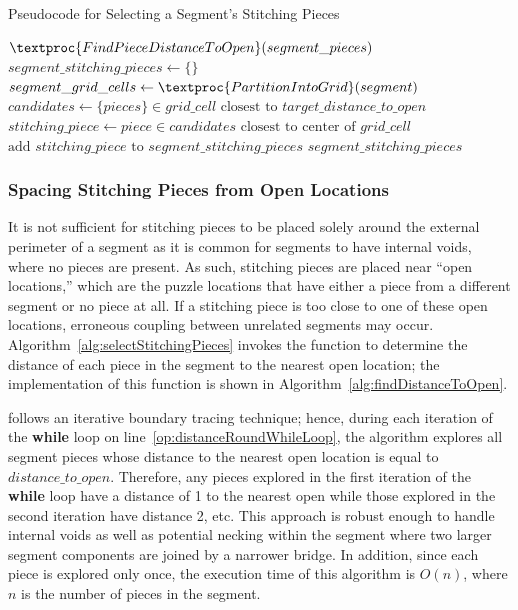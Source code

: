 \begin{algorithm}[t]
\caption{Pseudocode for Selecting a Segment's Stitching Pieces}
\label{alg:selectStitchingPieces}
\begin{algorithmic}[1]
	\State $\textproc{FindPieceDistanceToOpen}(segment\_pieces)$
	\State $segment\_stitching\_pieces \gets \{ \}$
    \State $segment\_grid\_cells \gets \textproc{PartitionIntoGrid}(segment)$
			\State $candidates \gets \{ pieces \} \in grid\_cell \text{ closest to } target\_distance\_to\_open$
			\State $stitching\_piece \gets piece \in candidates \text{ closest to center of } grid\_cell$
			\State $\text{add } stitching\_piece \text{ to } segment\_stitching\_pieces$
		\EndIf
	\EndFor
	\State \Return $segment\_stitching\_pieces$
\EndProcedure
\end{algorithmic}
\end{algorithm}


\subsubsection{Spacing Stitching Pieces from Open Locations}\label{sec:determiningSpacingToNearestOpenLocation}

It is not sufficient for stitching pieces to be placed solely around the external perimeter of a segment as it is common for segments to have internal voids, where no pieces are present.  As such, stitching pieces are placed near ``open locations,'' which are the puzzle locations that have either a piece from a different segment or no piece at all. If a stitching piece is too close to one of these open locations, erroneous coupling between unrelated segments may occur.  Algorithm~\ref{alg:selectStitchingPieces} invokes the function  to determine the distance of each piece in the segment to the nearest open location; the implementation of this function is shown in Algorithm~\ref{alg:findDistanceToOpen}.  

 follows an iterative boundary tracing technique; hence, during each iteration of the \textbf{while} loop on line~\ref{op:distanceRoundWhileLoop}, the algorithm explores all segment pieces whose distance to the nearest open location is equal to $distance\_to\_open$.  Therefore, any pieces explored in the first iteration of the \textbf{while} loop have a distance of 1 to the nearest open while those explored in the second iteration have distance 2, etc. This approach is robust enough to handle internal voids as well as potential necking within the segment where two larger segment components are joined by a narrower bridge. In addition, since each piece is explored only once, the execution time of this algorithm is $O(n)$, where $n$ is the number of pieces in the segment.

